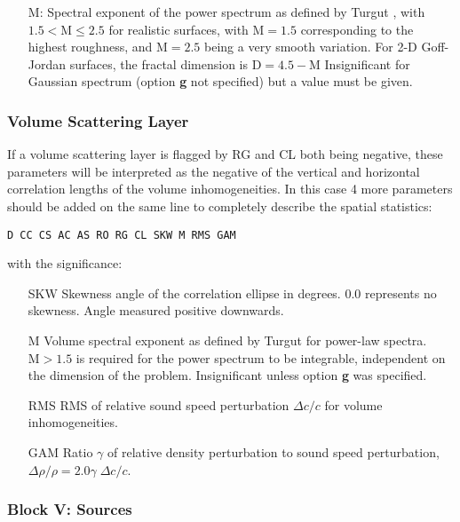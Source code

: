 \begin{itemize}
                \item[M:] Spectral exponent of the power spectrum as
                defined by Turgut \cite{Turgut_97}, with $1.5 <
                \mbox{M} \le 2.5 $ for realistic surfaces, with
                $\mbox{M} =1.5 $ corresponding to the highest
                roughness, and $\mbox{M}=2.5$ being a very smooth
                variation. For 2-D Goff-Jordan surfaces, the fractal
                dimension is $ \mbox{D} = 4.5 - \mbox{M} $
                Insignificant
                for Gaussian spectrum (option {\bf g} not specified)
                but a  value must
                be given.
\end{itemize}

\subsubsection{Volume Scattering Layer}
If a volume scattering layer is flagged by RG and CL both being
		negative, these parameters will be interpreted as the
		negative of the vertical and horizontal correlation
		lengths of the volume inhomogeneities. In this
		case 4 more parameters should be added on the same
		line to completely describe the spatial statistics:
\begin{verbatim}
D CC CS AC AS RO RG CL SKW M RMS GAM
\end{verbatim}
with the significance:
 \begin{itemize}
 \item[SKW] Skewness angle of the correlation ellipse in degrees. 0.0
 represents no skewness. Angle measured positive downwards.
 \item[M] Volume spectral exponent as defined by Turgut
 \cite{Turgut_97} for power-law spectra.  $ \mbox{M} > 1.5 $ is
 required for the power spectrum to be integrable, independent on the
 dimension of the problem. Insignificant
 unless option {\bf g} was specified.
 \item[RMS] RMS of relative sound speed perturbation $\Delta c / c$ for
 volume inhomogeneities.
 \item[GAM] Ratio $\gamma$ of relative density perturbation to sound speed
 perturbation, $ \Delta \rho / \rho = 2.0 \gamma \; \Delta c / c$.
 \end{itemize}



\subsubsection{Block V: Sources}

